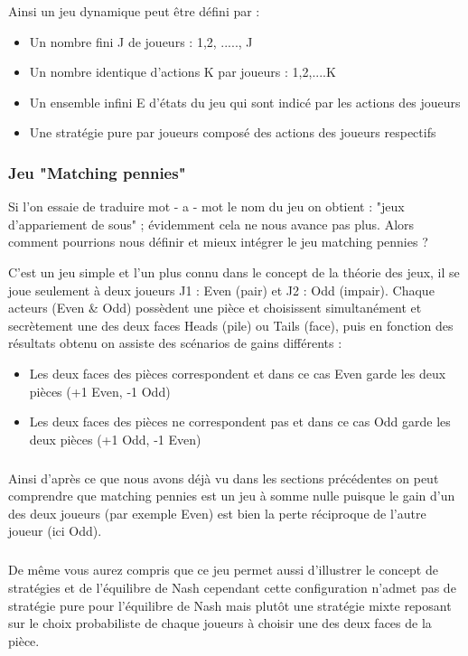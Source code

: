 \documentclass[a4paper, 12pt, twoside]{article}
\begin{document}
Ainsi un \textsf{jeu dynamique} peut être défini par : 
\begin{itemize}
\item Un nombre fini J de joueurs : {1,2, ....., J}
\item Un nombre identique d'actions K par joueurs : {1,2,....K}  
\item Un ensemble infini E d'états du jeu qui sont indicé par les actions des joueurs 
\item Une stratégie pure par joueurs composé des actions des joueurs respectifs
\end{itemize}


\subsubsection{Jeu "Matching pennies"}
Si l'on essaie de traduire mot - a - mot le nom du jeu on obtient : "jeux d'appariement de sous"  ; évidemment cela ne nous avance pas plus. Alors comment pourrions nous définir et mieux intégrer le jeu \textsf{matching pennies} ? \newline

C'est un jeu simple et l'un plus connu dans le concept de la théorie des jeux, il se joue seulement à deux joueurs J1 : \textsf{Even} (pair) et J2 : \textsf{Odd} (impair). Chaque acteurs (Even \& Odd) possèdent une pièce et choisissent simultanément et secrètement une des deux faces \textsf{Heads} (pile) ou \textsf{Tails} (face), puis en fonction des résultats obtenu on assiste des scénarios de gains différents :

\begin{itemize}
\item Les deux faces des pièces correspondent et dans ce cas Even garde les deux pièces (+1 Even, -1 Odd)
\item Les deux faces des pièces ne correspondent pas et dans ce cas Odd garde les deux pièces (+1 Odd, -1 Even)
\end{itemize}  \vspace{0.2 cm}

\subparagraph*{}{Ainsi d'après ce que nous avons déjà vu dans les sections précédentes on peut comprendre que \textsf{matching pennies} est un jeu à somme nulle puisque le gain d'un des deux joueurs (par exemple Even) est bien la perte réciproque de l'autre joueur (ici Odd).} 
\subparagraph*{}{De même vous aurez compris que ce jeu permet aussi d'illustrer le concept  de stratégies et de l'\textsf{équilibre de Nash} cependant cette configuration n'admet pas de stratégie pure pour l'\textsf{équilibre de Nash} mais plutôt une stratégie mixte reposant sur le choix probabiliste de chaque joueurs à choisir une des deux faces de la pièce.}
\end{document}
